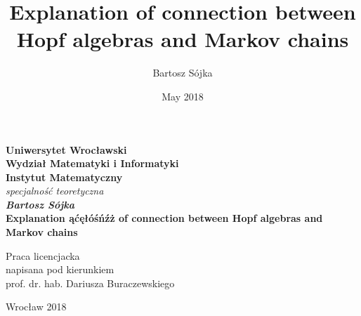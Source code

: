 \documentclass[a4paper, 12pt]{report}
\title{Explanation of connection between Hopf algebras and Markov chains}
\author{Bartosz Sójka}
\date{May 2018}
\begin{document}
\thispagestyle{empty}
\begin{center}
\textbf{\large Uniwersytet Wrocławski\\
Wydział Matematyki i Informatyki\\
Instytut Matematyczny}\\
\textit{\large specjalność teoretyczna}\\
\vspace{4cm}
\textbf{\textit{\large Bartosz Sójka}\\
\vspace{0.5cm}
{\Large Explanation ąćęłóśńźż of connection between Hopf algebras and Markov chains}}\\
\end{center}
\vspace{3cm}
{\large \hspace*{6.5cm}Praca licencjacka\\
\hspace*{6.5cm}napisana pod kierunkiem\\
\hspace*{6.5cm}prof. dr. hab. Dariusza Buraczewskiego }\\
\vfill
\begin{center}
{\large Wrocław 2018}\\
\end{center}
\newpage
\null
\thispagestyle{empty}
\newpage
\tableofcontents
\end{document}
